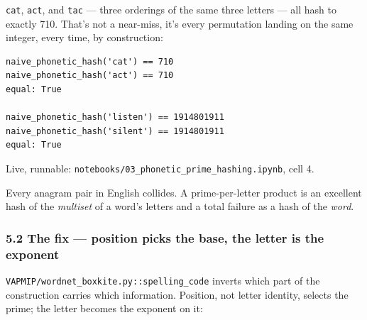\documentclass[
  10pt,
]{article}
\begin{document}
\texttt{cat}, \texttt{act}, and \texttt{tac} --- three orderings of the
same three letters --- all hash to exactly 710. That's not a near-miss,
it's every permutation landing on the same integer, every time, by
construction:

\begin{verbatim}
naive_phonetic_hash('cat') == 710
naive_phonetic_hash('act') == 710
equal: True

naive_phonetic_hash('listen') == 1914801911
naive_phonetic_hash('silent') == 1914801911
equal: True
\end{verbatim}

Live, runnable: \texttt{notebooks/03\_phonetic\_prime\_hashing.ipynb},
cell 4.

Every anagram pair in English collides. A prime-per-letter product is an
excellent hash of the \emph{multiset} of a word's letters and a total
failure as a hash of the \emph{word}.

\hypertarget{the-fix-position-picks-the-base-the-letter-is-the-exponent}{%
\subsubsection{5.2 The fix --- position picks the base, the letter is
the
exponent}\label{the-fix-position-picks-the-base-the-letter-is-the-exponent}}

\texttt{VAPMIP/wordnet\_boxkite.py::spelling\_code} inverts which part
of the construction carries which information. Position, not letter
identity, selects the prime; the letter becomes the exponent on it:
\end{document}
